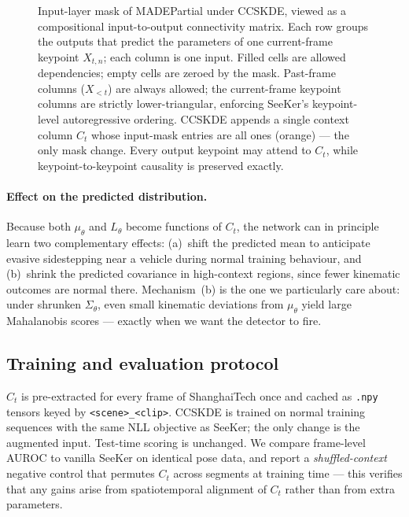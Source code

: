 \documentclass{article}
\begin{document}
\begin{figure}[t]
\caption{Input-layer mask of MADEPartial under CCSKDE, viewed as a
compositional input-to-output connectivity matrix. Each row groups the
outputs that predict the parameters of one current-frame keypoint
$X_{t,n}$; each column is one input. Filled cells are allowed dependencies;
empty cells are zeroed by the mask. Past-frame columns ($X_{<t}$) are
always allowed; the current-frame keypoint columns are strictly
lower-triangular, enforcing SeeKer's keypoint-level autoregressive
ordering. CCSKDE appends a single context column $C_t$ whose input-mask
entries are all ones (orange) --- the only mask change. Every output
keypoint may attend to $C_t$, while keypoint-to-keypoint causality is
preserved exactly.}
\label{fig:made_mask}
\end{figure}

\paragraph{Effect on the predicted distribution.}
Because both $\mu_{\theta}$ and $L_{\theta}$ become functions of $C_t$, the
network can in principle learn two complementary effects: (a)~shift the
predicted mean to anticipate evasive sidestepping near a vehicle during
normal training behaviour, and (b)~shrink the predicted covariance in
high-context regions, since fewer kinematic outcomes are normal there.
Mechanism~(b) is the one we particularly care about: under shrunken
$\Sigma_{\theta}$, even small kinematic deviations from $\mu_{\theta}$
yield large Mahalanobis scores --- exactly when we want the detector to
fire.

\subsection{Training and evaluation protocol}
\label{ssec:protocol}
$C_t$ is pre-extracted for every frame of ShanghaiTech once and cached as
\texttt{.npy} tensors keyed by \texttt{<scene>\_<clip>}. CCSKDE is trained
on normal training sequences with the same NLL objective as SeeKer; the
only change is the augmented input. Test-time scoring is unchanged. We
compare frame-level AUROC to vanilla SeeKer on identical pose data, and
report a \emph{shuffled-context} negative control that permutes $C_t$
across segments at training time --- this verifies that any gains arise
from spatiotemporal alignment of $C_t$ rather than from extra parameters.
\end{document}
